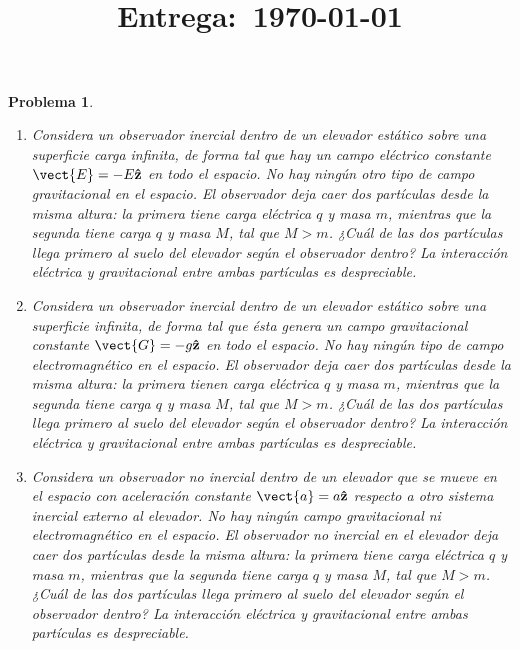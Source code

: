\documentclass[12pt]{article}
\title{
    \textbf{\homeworknumber}\\
    \normalsize\vspace{0.1in}\small{\textbf{Entrega}:~\today}
    \vspace{-1.5in}
}
\author{}
\date{}
\theoremstyle{break}
\newtheorem{exercise}{Problema}
\theoremstyle{nonumberbreak}
\DeclareRobustCommand{\uvec}[1]{{%
  \ifcsname uvec#1\endcsname
     \csname uvec#1\endcsname
   \else
    \bm{\hat{\mathbf{#1}}}%
   \fi
}}%
\begin{document}
    \maketitle
    \thispagestyle{fancy}
    
    \begin{exercise}
        \begin{enumerate}[label = \alph*)]
            \item Considera un observador inercial dentro de un elevador estático sobre una superficie carga infinita, de forma tal que hay un campo eléctrico constante \(\vect{E} = -E \uvec{z}\) en todo el espacio. No hay ningún otro tipo de campo gravitacional en el espacio. El observador deja caer dos partículas desde la misma altura: la primera tiene carga eléctrica \(q\) y masa \(m\), mientras que la segunda tiene carga \(q\) y masa \(M\), tal que \(M > m\). ¿Cuál de las dos partículas llega primero al suelo del elevador según el observador dentro? La interacción eléctrica y gravitacional entre ambas partículas es despreciable.
            \item Considera un observador inercial dentro de un elevador estático sobre una superficie infinita, de forma tal que ésta genera un campo gravitacional constante \(\vect{G} = -g\uvec{z}\) en todo el espacio. No hay ningún tipo de campo electromagnético en el espacio. El observador deja caer dos partículas desde la misma altura: la primera tienen carga eléctrica \(q\) y masa \(m\), mientras que la segunda tiene carga \(q\) y masa \(M\), tal que \(M > m\). ¿Cuál de las dos partículas llega primero al suelo del elevador según el observador dentro? La interacción eléctrica y gravitacional entre ambas partículas es despreciable.
            \item Considera un observador no inercial dentro de un elevador que se mueve en el espacio con aceleración constante \(\vect{a} = a\uvec{z}\) respecto a otro sistema inercial externo al elevador. No hay ningún campo gravitacional ni electromagnético en el espacio. El observador no inercial en el elevador deja caer dos partículas desde la misma altura: la primera tiene carga eléctrica \(q\) y masa \(m\), mientras que la segunda tiene carga \(q\) y masa \(M\), tal que \(M > m\). ¿Cuál de las dos partículas llega primero al suelo del elevador según el observador dentro? La interacción eléctrica y gravitacional entre ambas partículas es despreciable.
        \end{enumerate}
    \end{exercise}
\end{document}
